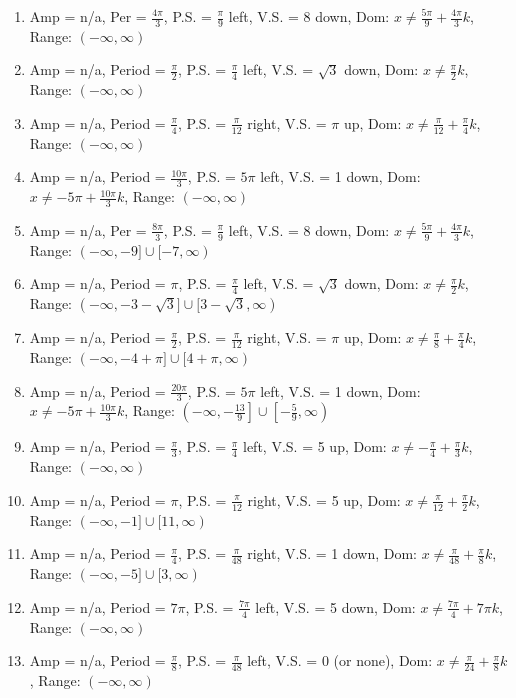 \begin{enumerate}
	\item Amp = n/a, Per = $\frac{4\pi}{3}$, P.S. = $\frac{\pi}{9}$ left, V.S. = 8 down, Dom: $x \neq \frac{5\pi}{9}+\frac{4\pi}{3}k$, Range: $(-\infty, \infty)$
	\item Amp = n/a, Period = $\frac{\pi}{2}$, P.S. = $\frac{\pi}{4}$ left, V.S. = $\sqrt{3}$ down, Dom: $x \neq \frac{\pi}{2}k$, Range: $(-\infty, \infty)$
	\item Amp = n/a, Period = $\frac{\pi}{4}$, P.S. = $\frac{\pi}{12}$ right, V.S. = $\pi$ up, Dom: $x \neq \frac{\pi}{12}+\frac{\pi}{4}k$, Range: $(-\infty, \infty)$
	\item Amp = n/a, Period = $\frac{10\pi}{3}$, P.S. = $5\pi$ left, V.S. = 1 down, Dom: $x \neq -5\pi + \frac{10\pi}{3}k$, Range: $(-\infty, \infty)$
	\item Amp = n/a, Per = $\frac{8\pi}{3}$, P.S. = $\frac{\pi}{9}$ left, V.S. = 8 down, Dom: $x \neq \frac{5\pi}{9}+\frac{4\pi}{3}k$, Range: $(-\infty, -9] \cup [-7, \infty)$
	\item Amp = n/a, Period = $\pi$, P.S. = $\frac{\pi}{4}$ left, V.S. = $\sqrt{3}$ down, Dom: $x \neq \frac{\pi}{2}k$, Range: $(-\infty, -3-\sqrt{3}] \cup [3-\sqrt{3}, \infty)$
	\item Amp = n/a, Period = $\frac{\pi}{2}$, P.S. = $\frac{\pi}{12}$ right, V.S. = $\pi$ up, Dom: $x \neq \frac{\pi}{8} + \frac{\pi}{4}k$, Range: $(-\infty, -4+\pi] \cup [4+\pi, \infty)$
	\item Amp = n/a, Period = $\frac{20\pi}{3}$, P.S. = $5\pi$ left, V.S. = 1 down, Dom: $x \neq -5\pi + \frac{10\pi}{3}k$, Range: $\left(-\infty, -\frac{13}{9}\right] \cup \left[ -\frac{5}{9}, \infty\right)$
	\item Amp = n/a, Period = $\frac{\pi}{3}$, P.S. = $\frac{\pi}{4}$ left, V.S. = 5 up, Dom: $x \neq -\frac{\pi}{4} + \frac{\pi}{3}k$, Range: $(-\infty, \infty)$
	\item Amp = n/a, Period = $\pi$, P.S. = $\frac{\pi}{12}$ right, V.S. = 5 up, Dom: $x \neq \frac{\pi}{12}+\frac{\pi}{2}k$, Range: $(-\infty, -1] \cup [11, \infty)$
	\item Amp = n/a, Period = $\frac{\pi}{4}$, P.S. = $\frac{\pi}{48}$ right, V.S. = 1 down, Dom: $x \neq \frac{\pi}{48} + \frac{\pi}{8}k$, Range: $(-\infty, -5] \cup [3, \infty)$
	\item Amp = n/a, Period = $7\pi$, P.S. = $\frac{7\pi}{4}$ left, V.S. = 5 down, Dom: $x \neq \frac{7\pi}{4} + 7\pi k$, Range: $(-\infty, \infty)$
	\item Amp = n/a, Period = $\frac{\pi}{8}$, P.S. = $\frac{\pi}{48}$ left, V.S. = 0 (or none), Dom: $x \neq \frac{\pi}{24} + \frac{\pi}{8}k$, Range: $(-\infty, \infty)$

\end{enumerate}
